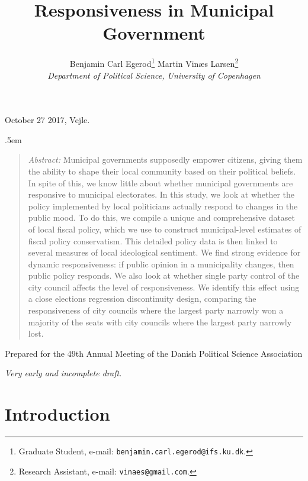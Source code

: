\documentclass[a4paper,12pt]{article}
\title{\bigskip \bigskip \sffamily \LARGE Responsiveness in Municipal Government}
\author{\bigskip Benjamin Carl Egerod\footnote{Graduate Student, e-mail: \texttt{benjamin.carl.egerod@ifs.ku.dk}.} \qquad Martin Vinæs Larsen\footnote{Research Assistant, e-mail: \texttt{vinaes@gmail.com}.} \\ \textit{Department of Political Science, University of Copenhagen}} %
\makeatletter
\renewcommand{\maketitle}{
	\begin{flushleft}
		
		\onehalfspacing
		
		\@title
		
		\lineskip .5em
		\normalfont{\normalsize{\@author}}
\end{flushleft}}
\makeatother
\begin{document}
	
	\begin{footnotesize} \noindent October 27 2017, Vejle. \end{footnotesize} %
	
	\vspace{0.7in}
	
	\maketitle
	
	\bigskip
	
	\begin{quotation} %

		\small \noindent \emph{Abstract:} Municipal governments supposedly empower citizens, giving them the ability to shape their local community based on their political beliefs. In spite of this, we know little about whether municipal governments are responsive to municipal electorates. In this study, we look at whether the policy implemented by local politicians actually respond to changes in the public mood. To do this, we compile a unique and comprehensive dataset of local fiscal policy, which we use to construct municipal-level estimates of fiscal policy conservatism. This detailed policy data is then linked to several measures of local ideological sentiment. We find strong evidence for dynamic responsiveness: if public opinion in a municipality changes, then public policy responds. We also look at whether single party control of the city council affects the level of responsiveness. We identify this effect using a close elections regression discontinuity design, comparing the responsiveness of city councils where the largest party narrowly won a majority of the seats with city councils where the largest party narrowly lost.
	\end{quotation}

\bigskip

\bigskip

\bigskip
	
	
	\noindent Prepared for the 49th Annual Meeting of the Danish Political Science Association \newline 
	
	\thispagestyle{empty} %
	
	
	\bigskip
	\noindent \textit{Very early and incomplete draft.}
	\bigskip
	\bigskip
	
	
	
\section{Introduction}
\end{document}
